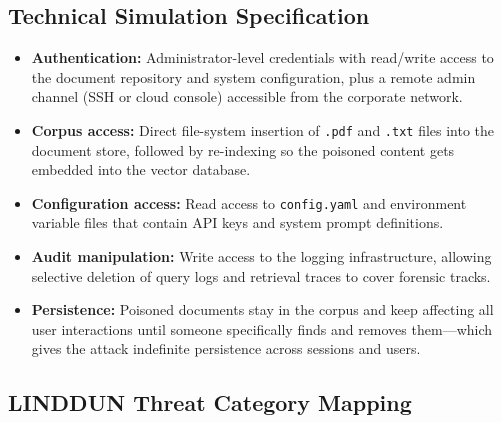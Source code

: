 \documentclass[12pt, a4paper]{report}
\begin{document}
\subsection{Technical Simulation Specification}

\begin{prosebox}
\begin{itemize}[leftmargin=1.4em, itemsep=3pt]
  \item \textbf{Authentication:} Administrator-level credentials with
        read/write access to the document repository and system configuration,
        plus a remote admin channel (SSH or cloud console) accessible from
        the corporate network.
  \item \textbf{Corpus access:} Direct file-system insertion of \texttt{.pdf}
        and \texttt{.txt} files into the document store, followed by
        re-indexing so the poisoned content gets embedded into the vector database.
  \item \textbf{Configuration access:} Read access to \texttt{config.yaml}
        and environment variable files that contain API keys and system prompt
        definitions.
  \item \textbf{Audit manipulation:} Write access to the logging
        infrastructure, allowing selective deletion of query logs and
        retrieval traces to cover forensic tracks.
  \item \textbf{Persistence:} Poisoned documents stay in the corpus and
        keep affecting all user interactions until someone specifically finds
        and removes them---which gives the attack indefinite persistence
        across sessions and users.
\end{itemize}
\end{prosebox}

\subsection{LINDDUN Threat Category Mapping}
\end{document}
